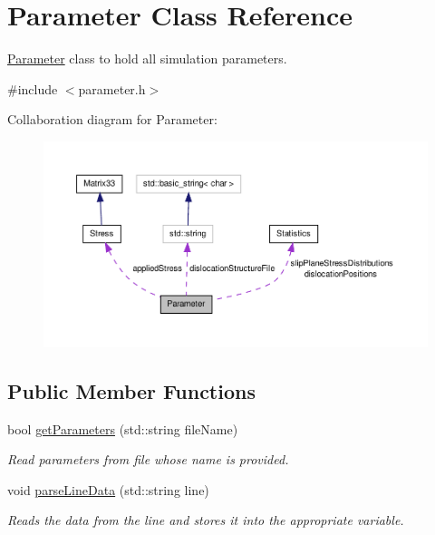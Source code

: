 \hypertarget{classParameter}{\section{\-Parameter \-Class \-Reference}
\label{dc/dab/classParameter}
}


\hyperlink{classParameter}{\-Parameter} class to hold all simulation parameters.  




{\ttfamily \#include $<$parameter.\-h$>$}



\-Collaboration diagram for \-Parameter\-:\nopagebreak
\begin{figure}[H]
\begin{center}
\leavevmode
\includegraphics[width=350pt]{de/dcf/classParameter__coll__graph}
\end{center}
\end{figure}
\subsection*{\-Public \-Member \-Functions}
\begin{DoxyCompactItemize}
\item 
bool \hyperlink{classParameter_a409aeedecc6ed43c8100db74efbd5847}{get\-Parameters} (std\-::string file\-Name)
\begin{DoxyCompactList}\small\item\em \-Read parameters from file whose name is provided. \end{DoxyCompactList}\item 
void \hyperlink{classParameter_a8bcbeb4aa70e43939cf0621aacb70735}{parse\-Line\-Data} (std\-::string line)
\begin{DoxyCompactList}\small\item\em \-Reads the data from the line and stores it into the appropriate variable. \end{DoxyCompactList}\end{DoxyCompactItemize}
